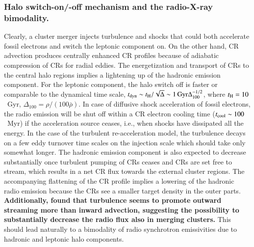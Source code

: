\documentclass[useAMS,usenatbib]{mn2e}
\begin{document}
\subsubsection{Halo switch-on/-off mechanism and the radio-X-ray bimodality.}
  Clearly, a cluster merger injects turbulence and shocks that could both
  accelerate fossil electrons and switch the leptonic component on. On the other
  hand, CR advection produces centrally enhanced CR profiles because of adiabatic
  compression of CRs for radial eddies. The energetization and transport of
  CRs to the central halo regions implies a lightening up of the hadronic
  emission component. For the leptonic component,
  the halo switch off is faster or comparable to the dynamical time scale,
  $t_{\rm dyn} \sim t_{\rm H}/\sqrt{\Delta} \sim 1 \,{\mathrm{Gyr}}
  \Delta_{100}^{-1/2}$, where $t_{\rm H}=10$~Gyr,
  $\Delta_{100}=\rho/(100\bar{\rho})$. In case of diffusive shock acceleration
  of fossil electrons, the radio emission will be shut off within a CR electron
  cooling time ($t_{\mathrm{cool}}\sim100$~Myr) if the acceleration source ceases,
  i.e., when shocks have dissipated all the energy. In the case of the turbulent
  re-acceleration model, the turbulence decays on a few eddy turnover time
  scales on the injection scale which should take only somewhat longer. The
  hadronic emission component is also expected to decrease substantially once
  turbulent pumping of CRs ceases and CRs are set free to stream, which results
  in a net CR flux towards the external cluster regions. The accompanying
  flattening of the CR profile implies a lowering of the hadronic radio emission
  because the CRs see a smaller target density in the outer parts. 
  {\bf Additionally, \cite{2013arXiv1303.4746W} found that turbulence seems 
  to promote outward streaming more than inward advection, suggesting the 
  possibility to substantially decrease the radio flux also in merging clusters.} 
  This should lead naturally to a bimodality of radio synchrotron emissivities due to
  hadronic and leptonic halo components.
\end{document}
